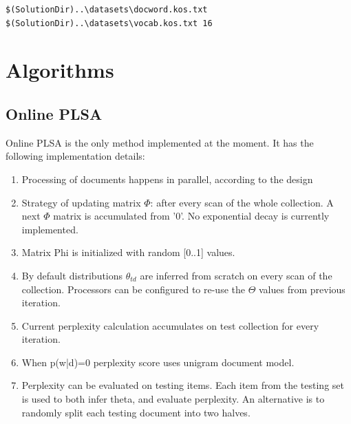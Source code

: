 \documentclass[11pt,a4paper,twoside]{report}
\begin{document}
{\small
\begin{verbatim}
$(SolutionDir)..\datasets\docword.kos.txt $(SolutionDir)..\datasets\vocab.kos.txt 16
\end{verbatim}}

\section{Algorithms}

\subsection{Online PLSA}
Online PLSA is the only method implemented at the moment.
It has the following implementation details:
\begin{enumerate}
    \item Processing of documents happens in parallel, according to the design
    \item Strategy of updating matrix $\Phi$: after every scan of the whole collection.
          A next $\Phi$ matrix is accumulated from '0'.
          No exponential decay is currently implemented.
    \item Matrix Phi is initialized with random [0..1] values.
    \item By default distributions $\theta_{t d}$ are inferred from scratch on every scan of the collection.
          Processors can be configured to re-use the $\Theta$ values from previous iteration.
    \item Current perplexity calculation accumulates on test collection for every iteration.
    \item When p(w|d)=0 perplexity score uses unigram document model.
    \item Perplexity can be evaluated on testing items.
          Each item from the testing set is used to both infer theta, and evaluate perplexity.
          An alternative is to randomly split each testing document into two halves.
\end{enumerate}
\end{document}
